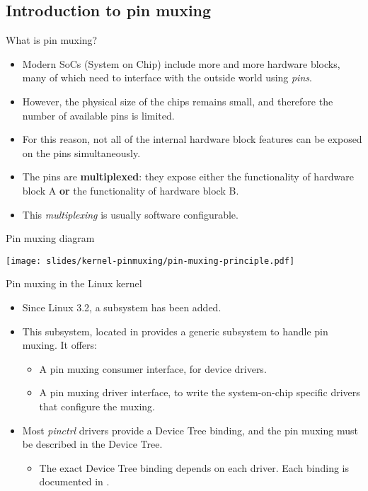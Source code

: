 \subsection{Introduction to pin muxing}

\begin{frame}{What is pin muxing?}
  \begin{itemize}
  \item Modern SoCs (System on Chip) include more and more hardware
    blocks, many of which need to interface with the outside world
    using {\em pins}.
  \item However, the physical size of the chips remains small, and
    therefore the number of available pins is limited.
  \item For this reason, not all of the internal hardware block
    features can be exposed on the pins simultaneously.
  \item The pins are {\bf multiplexed}: they expose either the
    functionality of hardware block A {\bf or} the functionality of
    hardware block B.
  \item This {\em multiplexing} is usually software configurable.
  \end{itemize}
\end{frame}

\begin{frame}{Pin muxing diagram}
  \begin{center}
    \texttt{[image: slides/kernel-pinmuxing/pin-muxing-principle.pdf]}
  \end{center}
\end{frame}

\begin{frame}{Pin muxing in the Linux kernel}
  \begin{itemize}
  \item Since Linux 3.2, a  subsystem has been added.
  \item This subsystem, located in  provides a
    generic subsystem to handle pin muxing. It offers:
    \begin{itemize}
    \item A pin muxing consumer interface, for device drivers.
    \item A pin muxing driver interface, to write the system-on-chip
      specific drivers that configure the muxing.
    \end{itemize}
  \item Most {\em pinctrl} drivers provide a Device Tree binding, and
    the pin muxing must be described in the Device Tree.
    \begin{itemize}
    \item The exact Device Tree binding depends on each driver. Each
      binding is documented in
      .
    \end{itemize}
  \end{itemize}
\end{frame}

